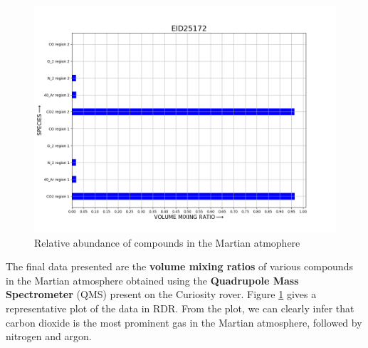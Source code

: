 \begin{figure}[H]
  \includegraphics[scale=0.4]{Pictures/Chapter_7_Future/EID25172.png}
  \centering
  \caption{Relative abundance of compounds in the Martian atmophere}
  \label{gra:qms}
\end{figure}

\no The final data presented are the \textbf{volume mixing ratios} of various compounds in the Martian atmosphere obtained using the \textbf{Quadrupole Mass Spectrometer} (QMS) present on the Curiosity rover. Figure \ref{gra:qms} gives a representative plot of the data in RDR. From the plot, we can clearly infer that carbon dioxide is the most prominent gas in the Martian atmosphere, followed by nitrogen and argon.